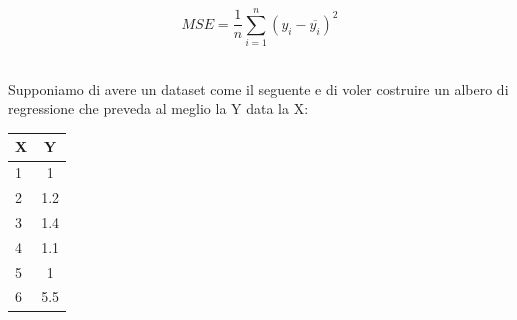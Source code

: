 \documentclass[a4paper, 11pt, oneside]{report}
\begin{document}
                \[
                    MSE = \frac{1}{n}\sum_{i=1}^{n}(y_i - \overline{y_i})^2
                \]
                \\
                \par \noindent Supponiamo di avere un dataset come il seguente e di voler costruire un albero di regressione
                che preveda al meglio la Y data la X:
                \begin{center}
                    \begin{tabular}{| l | c |}      %
                        \hline                      %
                        X & Y\\                     %
                        \hline
                        1 & 1\\
                        \hline
                        2 & 1.2\\
                        \hline
                        3 & 1.4\\
                        \hline
                        4 & 1.1\\
                        \hline
                        5 & 1\\
                        \hline
                        6 & 5.5\\
                        \hline
                    \end{tabular}
                \end{center}
\end{document}
